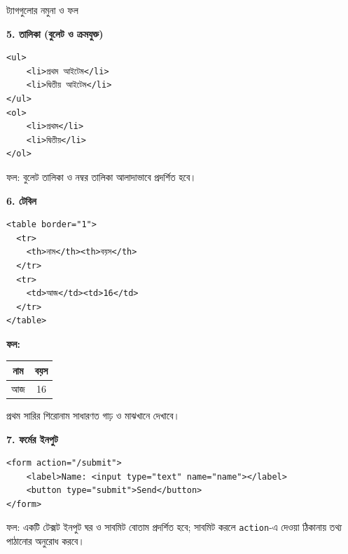\begin{examplebox}{ট্যাগগুলোর নমুনা ও ফল}
\vspace{6pt}
\par\noindent\textbf{5. তালিকা (বুলেট ও ক্রমযুক্ত)}\par
\begin{minipage}[t]{.50\linewidth}\vspace{0pt}
\begin{chFourBanglaCode}
\begin{verbatim}
<ul>
	<li>প্রথম আইটেম</li>
	<li>দ্বিতীয় আইটেম</li>
</ul>
<ol>
	<li>প্রথম</li>
	<li>দ্বিতীয়</li>
</ol>
\end{verbatim}
\end{chFourBanglaCode}
\end{minipage}\hfill
\begin{minipage}[t]{.46\linewidth}\vspace{0pt}
ফল: বুলেট তালিকা ও নম্বর তালিকা আলাদাভাবে প্রদর্শিত হবে।
\end{minipage}


\vspace{6pt}
\par\noindent\textbf{6. টেবিল}\par
\begin{minipage}[t]{.50\linewidth}\vspace{0pt}
\begin{chFourBanglaCode}
\begin{verbatim}
<table border="1">
  <tr>
    <th>নাম</th><th>বয়স</th>
  </tr>
  <tr>
    <td>আজ</td><td>16</td>
  </tr>
</table>
\end{verbatim}
\end{chFourBanglaCode}
\end{minipage}\hfill
\begin{minipage}[t]{.46\linewidth}\vspace{0pt}
\textbf{ফল:}\par
\begin{tabular}{|c|c|}
\hline
\textbf{নাম} & \textbf{বয়স} \\
\hline
আজ & 16 \\
\hline
\end{tabular}\par
প্রথম সারির শিরোনাম সাধারণত গাঢ় ও মাঝখানে দেখাবে।
\end{minipage}


\vspace{6pt}
\par\noindent\begin{minipage}{\linewidth}
\textbf{7. ফর্মের ইনপুট}\\
\begin{verbatim}
<form action="/submit">
	<label>Name: <input type="text" name="name"></label>
	<button type="submit">Send</button>
</form>
\end{verbatim}
ফল: একটি টেক্সট ইনপুট ঘর ও সাবমিট বোতাম প্রদর্শিত হবে; সাবমিট করলে \texttt{action}-এ দেওয়া ঠিকানায় তথ্য পাঠানোর অনুরোধ করবে।
\end{minipage}\par


\end{examplebox}
